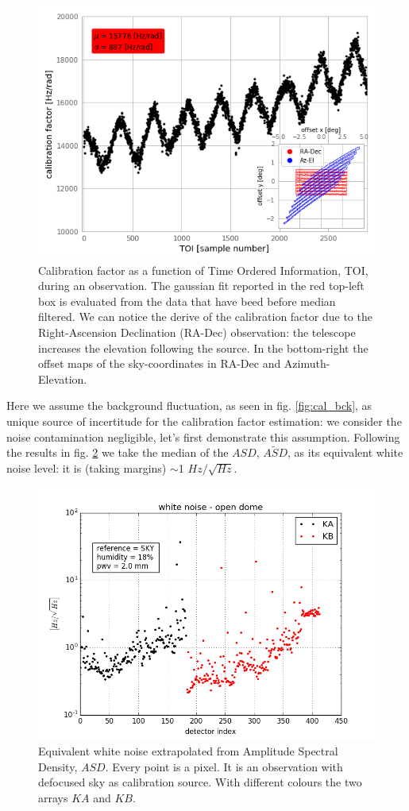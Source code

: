 \documentclass[twocolumn,traditabstract]{aa}\\
\begin{document}
\begin{figure}[htf]
	\centering
	\includegraphics[width=.5\textwidth]{4.results/calfact.png}
	\caption{Calibration factor as a function of Time Ordered Information, TOI, during an observation. The gaussian fit reported in the red top-left box is evaluated from the data that have beed before median filtered. We can notice the derive of the calibration factor due to the Right-Ascension Declination (RA-Dec) observation: the telescope increases the elevation following the source. In the bottom-right the offset maps of the sky-coordinates in RA-Dec and Azimuth-Elevation.}
	\label{fig:calfact}
\end{figure}


Here we assume the background fluctuation, as seen in fig. \ref{fig:cal_bck}, as unique source of incertitude for the calibration factor estimation: we consider the noise contamination negligible, let's first demonstrate this assumption. Following the results in fig. \ref{fig:ASD} we take the median of the $ASD$, $\tilde{ASD}$, as its equivalent white noise level: it is (taking margins) $\sim$1 $Hz/\sqrt{Hz}$.

\begin{figure}[htf]
	\centering
	\includegraphics[width=.5\textwidth]{4.results/white_noise_index.png}
	\caption{Equivalent white noise extrapolated from Amplitude Spectral Density, $ASD$. Every point is a pixel. It is an observation with defocused sky as calibration source. With different colours the two arrays $KA$ and $KB$.}
	\label{fig:ASD}
\end{figure}
\end{document}
